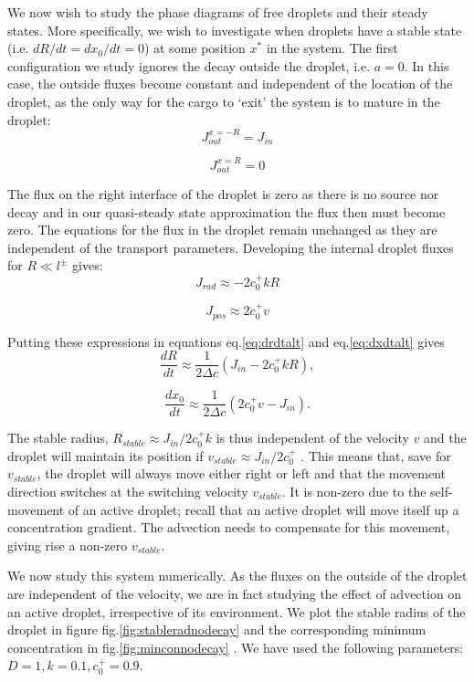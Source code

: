 \documentclass{Dissertate}
\begin{document}
We now wish to study the phase diagrams of free droplets and their
steady states. More specifically, we wish to investigate when droplets
have a stable state (i.e. \(dR/dt=dx_0/dt=0\)) at some position \(x^*\)
in the system. The first configuration we study ignores the decay
outside the droplet, i.e. \(a=0\). In this case, the outside fluxes
become constant and independent of the location of the droplet, as the
only way for the cargo to `exit' the system is to mature in the droplet:
\[
J_{out}^{x=-R} = J_{in}
\]

\[
J_{out}^{x=R} =0
\]

The flux on the right interface of the droplet is zero as there is no
source nor decay and in our quasi-steady state approximation the flux
then must become zero. The equations for the flux in the droplet remain
unchanged as they are independent of the transport parameters.
Developing the internal droplet fluxes for \(R\ll l^\pm\) gives:
\begin{equation}
J_{rad}\approx -2 c_0^+kR
\label{eq:jrad}\end{equation}

\begin{equation}
J_{pos}\approx2 c_0^+v 
\label{eq:posfluxapprox}\end{equation}

Putting these expressions in equations eq.\ref{eq:drdtalt} and
eq.\ref{eq:dxdtalt} gives \begin{equation}
\frac{dR}{dt} \approx \frac{1}{2\Delta c}(J_{in}-2 c_0^+kR),
\label{eq:drdtapproxnodecay}\end{equation}

\[
\frac{dx_0}{dt} \approx \frac{1}{2\Delta c}(2 c_0^+v-J_{in}).
\]

The stable radius, \(R_{stable} \approx J_{in}/2c_0^+k\) is thus
independent of the velocity \(v\) and the droplet will maintain its
position if \(v_{stable}\approx J_{in}/2c_0^+\) . This means that, save
for \(v_{stable}\), the droplet will always move either right or left
and that the movement direction switches at the switching velocity
\(v_{stable}\). It is non-zero due to the self-movement of an active
droplet; recall that an active droplet will move itself up a
concentration gradient. The advection needs to compensate for this
movement, giving rise a non-zero \(v_{stable}\).

We now study this system numerically. As the fluxes on the outside of
the droplet are independent of the velocity, we are in fact studying the
effect of advection on an active droplet, irrespective of its
environment. We plot the stable radius of the droplet in figure
fig.\ref{fig:stableradnodecay} and the corresponding minimum
concentration in fig.\ref{fig:minconnodecay} . We have used the
following parameters: \(D=1, k=0.1, c_0^+=0.9\).
\end{document}
